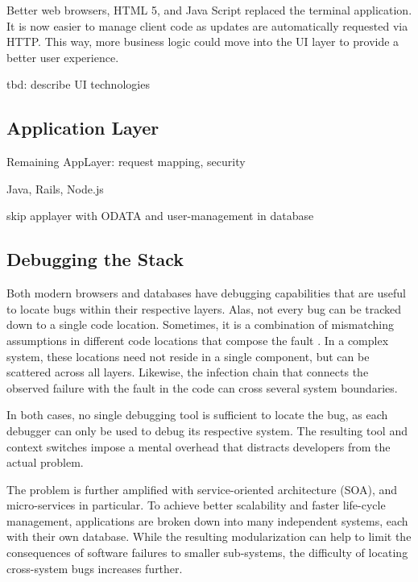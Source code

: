 Better web browsers, HTML 5, and Java Script replaced the terminal application.
It is now easier to manage client code as updates are automatically requested via HTTP.
This way, more business logic could move into the UI layer to provide a better user experience.

tbd: describe UI technologies

\subsection{Application Layer}

Remaining AppLayer: request mapping, security

Java, Rails, Node.js

skip applayer with ODATA and user-management in database

\subsection{Debugging the Stack}

Both modern browsers and databases have debugging capabilities that are useful to locate bugs within their respective layers.
Alas, not every bug can be tracked down to a single code location. 
Sometimes, it is a combination of mismatching assumptions in different code locations that compose the fault .
In a complex system, these locations need not reside in a single component, but can be scattered across all layers.
Likewise, the infection chain that connects the observed failure with the fault in the code can cross several system boundaries.

In both cases, no single debugging tool is sufficient to locate the bug, as each debugger can only be used to debug its respective system.
The resulting tool and context switches impose a mental overhead that distracts developers from the actual problem.

The problem is further amplified with service-oriented architecture (SOA), and micro-services in particular.
To achieve better scalability and faster life-cycle management, applications are broken down into many independent systems, each with their own database.
While the resulting modularization can help to limit the consequences of software failures to smaller sub-systems, the difficulty of locating cross-system bugs increases further.

